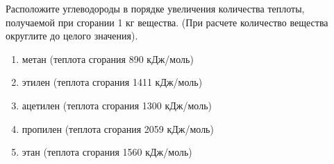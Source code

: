 
Расположите
углеводороды в порядке увеличения количества теплоты, получаемой при сгорании 1
кг вещества. (При расчете количество вещества округлите до целого значения).

\begin{enumerate}
    \item метан (теплота сгорания 890 кДж/моль)
    \item этилен (теплота сгорания 1411 кДж/моль)
    \item ацетилен (теплота сгорания 1300 кДж/моль)
    \item пропилен (теплота сгорания 2059 кДж/моль)
    \item этан (теплота сгорания 1560 кДж/моль)
\end{enumerate}

